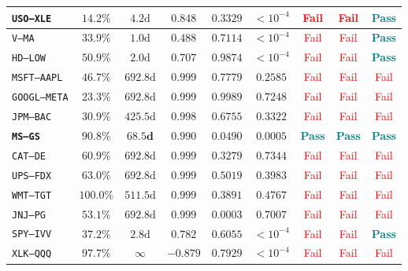 \documentclass[11pt, a4paper]{article}
\begin{document}
\begin{table}[h!]
\begin{tabular}{lcccccccc}
\texttt{USO--XLE}  & $14.2\%$ & $4.2\text{d}$   & $0.848$ & $0.3329$ & $<10^{-4}$ & \textcolor{red}{Fail} & \textcolor{red}{Fail} & \textcolor{teal}{\textbf{Pass}} \\
\midrule
\texttt{V--MA}     & $33.9\%$ & $1.0\text{d}$   & $0.488$ & $0.7114$ & $<10^{-4}$ & \textcolor{red}{Fail} & \textcolor{red}{Fail} & \textcolor{teal}{\textbf{Pass}} \\
\texttt{HD--LOW}   & $50.9\%$ & $2.0\text{d}$   & $0.707$ & $0.9874$ & $<10^{-4}$ & \textcolor{red}{Fail} & \textcolor{red}{Fail} & \textcolor{teal}{\textbf{Pass}} \\
\texttt{MSFT--AAPL}& $46.7\%$ & $692.8\text{d}$ & $0.999$ & $0.7779$ & $0.2585$ & \textcolor{red}{Fail} & \textcolor{red}{Fail} & \textcolor{red}{Fail} \\
\texttt{GOOGL--META}&$23.3\%$ & $692.8\text{d}$ & $0.999$ & $0.9989$ & $0.7248$ & \textcolor{red}{Fail} & \textcolor{red}{Fail} & \textcolor{red}{Fail} \\
\texttt{JPM--BAC}  & $30.9\%$ & $425.5\text{d}$ & $0.998$ & $0.6755$ & $0.3322$ & \textcolor{red}{Fail} & \textcolor{red}{Fail} & \textcolor{red}{Fail} \\
\texttt{\textbf{MS--GS}} & $\mathbf{90.8\%}$ & $\mathbf{68.5\text{d}}$ & $\mathbf{0.990}$ & $\mathbf{0.0490}$ & $\mathbf{0.0005}$ & \textcolor{teal}{\textbf{Pass}} & \textcolor{teal}{\textbf{Pass}} & \textcolor{teal}{\textbf{Pass}} \\
\texttt{CAT--DE}   & $60.9\%$ & $692.8\text{d}$ & $0.999$ & $0.3279$ & $0.7344$ & \textcolor{red}{Fail} & \textcolor{red}{Fail} & \textcolor{red}{Fail} \\
\texttt{UPS--FDX}  & $63.0\%$ & $692.8\text{d}$ & $0.999$ & $0.5019$ & $0.3983$ & \textcolor{red}{Fail} & \textcolor{red}{Fail} & \textcolor{red}{Fail} \\
\texttt{WMT--TGT}  & $100.0\%$& $511.5\text{d}$ & $0.999$ & $0.3891$ & $0.4767$ & \textcolor{red}{Fail} & \textcolor{red}{Fail} & \textcolor{red}{Fail} \\
\texttt{JNJ--PG}   & $53.1\%$ & $692.8\text{d}$ & $0.999$ & $0.0003$ & $0.7007$ & \textcolor{red}{Fail} & \textcolor{red}{Fail} & \textcolor{red}{Fail} \\
\texttt{SPY--IVV}  & $37.2\%$ & $2.8\text{d}$   & $0.782$ & $0.6055$ & $<10^{-4}$ & \textcolor{red}{Fail} & \textcolor{red}{Fail} & \textcolor{teal}{\textbf{Pass}} \\
\texttt{XLK--QQQ}  & $97.7\%$ & $\infty$        & $-0.879$& $0.7929$ & $<10^{-4}$ & \textcolor{red}{Fail} & \textcolor{red}{Fail} & \textcolor{red}{Fail} \\
\bottomrule
\end{tabular}
\end{table}
\end{document}
